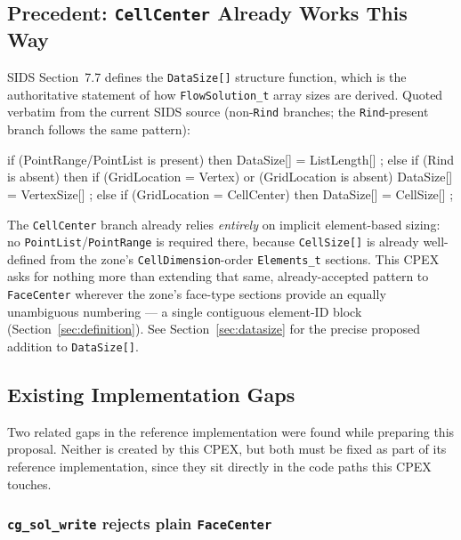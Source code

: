 \documentclass[11pt,letterpaper]{article}
\makeatletter
\let\cgns@orig@lstlisting\lstlisting
\let\cgns@endorig@lstlisting\endlstlisting
\renewenvironment{lstlisting}
  {\par\needspace{5\baselineskip}\nolinenumbers\cgns@orig@lstlisting}
  {\cgns@endorig@lstlisting\par\linenumbers}
\makeatother
\begin{document}
\subsection{Precedent: \texttt{CellCenter} Already Works This Way}

SIDS Section~7.7 defines the \texttt{DataSize[]} structure function,
which is the authoritative statement of how \texttt{FlowSolution\_t}
array sizes are derived. Quoted verbatim from the current SIDS source
(non-\texttt{Rind} branches; the \texttt{Rind}-present branch follows the
same pattern):

\begin{lstlisting}[language=C]
if (PointRange/PointList is present) then
  {
  DataSize[] = ListLength[] ;
  }
else if (Rind is absent) then
  {
  if (GridLocation = Vertex) or (GridLocation is absent)
    {
    DataSize[] = VertexSize[] ;
    }
  else if (GridLocation = CellCenter) then
    {
    DataSize[] = CellSize[] ;
    }
  }
\end{lstlisting}

The \texttt{CellCenter} branch already relies \emph{entirely} on implicit
element-based sizing: no \texttt{PointList}/\texttt{PointRange} is
required there, because \texttt{CellSize[]} is already well-defined from
the zone's \texttt{CellDimension}-order \texttt{Elements\_t} sections.
This CPEX asks for nothing more than extending that same,
already-accepted pattern to \texttt{FaceCenter} wherever the zone's
face-type sections provide an equally unambiguous numbering --- a single
contiguous element-ID block (Section~\ref{sec:definition}). See
Section~\ref{sec:datasize} for the precise proposed addition to
\texttt{DataSize[]}.

\subsection{Existing Implementation Gaps}
\label{sec:implementation-gaps}

Two related gaps in the reference implementation were found while
preparing this proposal. Neither is created by this CPEX, but both must
be fixed as part of its reference implementation, since they sit
directly in the code paths this CPEX touches.

\subsubsection{\texttt{cg\_sol\_write} rejects plain \texttt{FaceCenter}}
\label{sec:cg_sol_write_gap}
\end{document}
